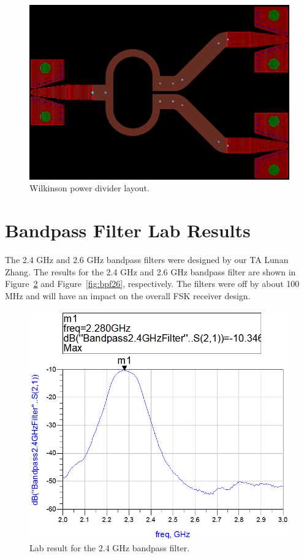 \documentclass[conference]{IEEEtran}
\begin{document}
\begin{figure}[!htb]
\centering
\includegraphics[scale=0.35]{wilkinson-pics/wilkinson-layout.png}
\caption{Wilkinson power divider layout.}
\label{fig:WDLayout}
\end{figure}

\section{Bandpass Filter Lab Results}
The 2.4 GHz and 2.6 GHz bandpass filters were designed by our TA Lunan Zhang\cite{lunan}.  The results for the 2.4 GHz and 2.6 GHz bandpass filter are shown in Figure~\ref{fig:bpf24} and Figure~\ref{fig:bpf26}, respectively.  The filters were off by about 100 MHz and will have an impact on the overall FSK receiver design.

\begin{figure}[!htb]
\centering
\includegraphics[scale=0.35]{bandpass-pics/bpf24.png}
\caption{Lab result for the 2.4 GHz bandpass filter.}
\label{fig:bpf24}
\end{figure}
\end{document}
